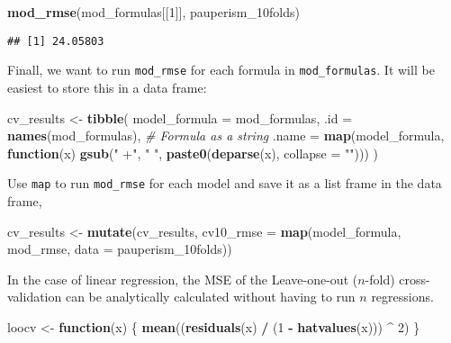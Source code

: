 \documentclass[]{article}
\newenvironment{Shaded}{\begin{snugshade}}{\end{snugshade}}
\newcommand{\KeywordTok}[1]{\textcolor[rgb]{0.13,0.29,0.53}{\textbf{#1}}}
\newcommand{\DataTypeTok}[1]{\textcolor[rgb]{0.13,0.29,0.53}{#1}}
\newcommand{\DecValTok}[1]{\textcolor[rgb]{0.00,0.00,0.81}{#1}}
\newcommand{\StringTok}[1]{\textcolor[rgb]{0.31,0.60,0.02}{#1}}
\newcommand{\CommentTok}[1]{\textcolor[rgb]{0.56,0.35,0.01}{\textit{#1}}}
\newcommand{\ControlFlowTok}[1]{\textcolor[rgb]{0.13,0.29,0.53}{\textbf{#1}}}
\newcommand{\OperatorTok}[1]{\textcolor[rgb]{0.81,0.36,0.00}{\textbf{#1}}}
\newcommand{\NormalTok}[1]{#1}
\begin{document}
\begin{Shaded}
\begin{Highlighting}[]
\KeywordTok{mod_rmse}\NormalTok{(mod_formulas[[}\DecValTok{1}\NormalTok{]], pauperism_10folds)}
\end{Highlighting}
\end{Shaded}

\begin{verbatim}
## [1] 24.05803
\end{verbatim}

Finall, we want to run \texttt{mod\_rmse} for each formula in
\texttt{mod\_formulas}. It will be easiest to store this in a data
frame:

\begin{Shaded}
\begin{Highlighting}[]
\NormalTok{cv_results <-}\StringTok{ }\KeywordTok{tibble}\NormalTok{(}
  \DataTypeTok{model_formula =}\NormalTok{ mod_formulas,}
  \DataTypeTok{.id =} \KeywordTok{names}\NormalTok{(mod_formulas),}
  \CommentTok{# Formula as a string}
  \DataTypeTok{.name =} \KeywordTok{map}\NormalTok{(model_formula,}
              \ControlFlowTok{function}\NormalTok{(x) }\KeywordTok{gsub}\NormalTok{(}\StringTok{" +"}\NormalTok{, }\StringTok{" "}\NormalTok{, }\KeywordTok{paste0}\NormalTok{(}\KeywordTok{deparse}\NormalTok{(x), }\DataTypeTok{collapse =} \StringTok{""}\NormalTok{)))}
\NormalTok{)}
\end{Highlighting}
\end{Shaded}

Use \texttt{map} to run \texttt{mod\_rmse} for each model and save it as
a list frame in the data frame,

\begin{Shaded}
\begin{Highlighting}[]
\NormalTok{cv_results <-}
\StringTok{  }\KeywordTok{mutate}\NormalTok{(cv_results,}
         \DataTypeTok{cv10_rmse =} \KeywordTok{map}\NormalTok{(model_formula, mod_rmse, }\DataTypeTok{data =}\NormalTok{ pauperism_10folds))}
\end{Highlighting}
\end{Shaded}

In the case of linear regression, the MSE of the Leave-one-out
(\(n\)-fold) cross-validation can be analytically calculated without
having to run \(n\) regressions.

\begin{Shaded}
\begin{Highlighting}[]
\NormalTok{loocv <-}\StringTok{ }\ControlFlowTok{function}\NormalTok{(x) \{}
  \KeywordTok{mean}\NormalTok{((}\KeywordTok{residuals}\NormalTok{(x) }\OperatorTok{/}\StringTok{ }\NormalTok{(}\DecValTok{1} \OperatorTok{-}\StringTok{ }\KeywordTok{hatvalues}\NormalTok{(x))) }\OperatorTok{^}\StringTok{ }\DecValTok{2}\NormalTok{)}
\NormalTok{\}}
\end{Highlighting}
\end{Shaded}
\end{document}
